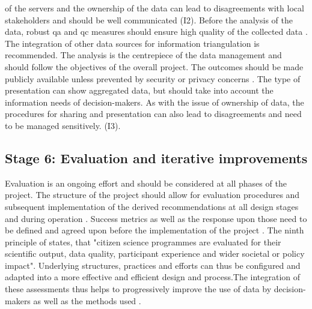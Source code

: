 of the servers and the ownership of the data can lead to disagreements with local stakeholders and should be well communicated (I2). Before the analysis of the data, robust \acrshort{qa} and \acrshort{qc} measures should ensure high quality of the collected data \autocite{fraislCitizenScienceEnvironmental2022,sharpeCommunityBasedEcological2006}. The integration of other data sources for information triangulation is recommended. The analysis is the centrepiece of the data management and should follow the objectives of the overall project. The outcomes should be made publicly available unless prevented by security or privacy concerns \autocite{escaeuropeancitizenscienceassociationTenPrinciplesCitizen2015,sharpeCommunityBasedEcological2006}. The type of presentation can show aggregated data, but should take into account the information needs of decision-makers. As with the issue of ownership of data, the procedures for sharing and presentation can also lead to disagreements and need to be  managed sensitively. (I3)\autocite{ifrcCommunityBasedSurveillanceGuiding2017}. %

\subsection{Stage 6: Evaluation and iterative improvements}
Evaluation is an ongoing effort and should be considered at all phases of the project. The structure of the project should allow for evaluation procedures and subsequent implementation of the derived recommendations at all design stages and during operation \autocite{fraislCitizenScienceEnvironmental2022,ifrcCommunityBasedSurveillanceGuiding2017}. Success metrics as well as the response upon those need to be defined and agreed upon before the implementation of the project \autocite{fraislCitizenScienceEnvironmental2022,gualazziniEWEAEarlyWarning2021}. The ninth principle of \autocite{escaeuropeancitizenscienceassociationTenPrinciplesCitizen2015} states, that "citizen science programmes are evaluated for their scientific output, data quality, participant experience and wider societal or policy impact". Underlying structures, practices and efforts can thus be configured and adapted into a more effective and efficient design and process.The integration of these assessments thus helps to progressively improve the use of data by decision-makers as well as the methods used \autocite{fraislCitizenScienceEnvironmental2022}.


